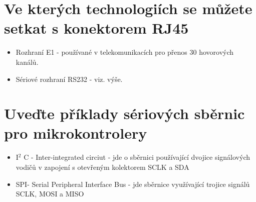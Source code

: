 \section{Ve kterých technologiích se můžete setkat s konektorem RJ45}
\begin{itemize}
    \item Rozhraní E1 - používané v telekomunikacích pro přenos 30 hovorových kanálů.
    \item Sériové rozhraní RS232 - viz. výše.
\end{itemize}
\section{Uveďte příklady sériových sběrnic pro mikrokontrolery}
\begin{itemize}
    \item I$^2$ C - Inter-integrated circiut - jde o sběrnici používající dvojice signálových vodičů v zapojení s otevřeným kolektorem SCLK a SDA
    \item SPI- Serial Peripheral Interface Bus - jde sběrnice využívající trojice signálů SCLK, MOSI a MISO
\end{itemize}